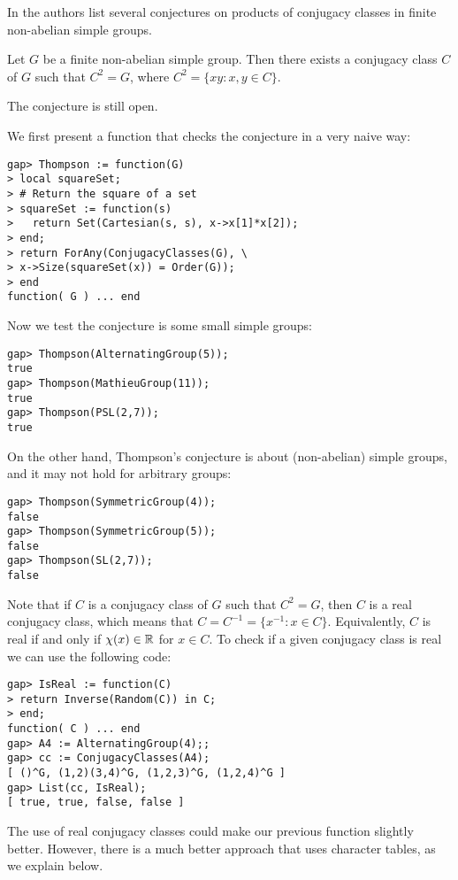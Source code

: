In \cite{MR783067} the authors list several conjectures
on products of conjugacy classes in finite non-abelian simple groups. 

\begin{conjecture}[Thompson]
    Let $G$ be a finite non-abelian simple group. Then there
    exists a conjugacy class $C$ of $G$ such that 
    $C^2=G$, where 
    $C^2=\{xy:x,y\in C\}$. 
\end{conjecture}

The conjecture is still open.

\begin{example}
    We first present a function that
    checks the conjecture in a very naive way:
\begin{lstlisting}
gap> Thompson := function(G)
> local squareSet;
> # Return the square of a set
> squareSet := function(s)
>   return Set(Cartesian(s, s), x->x[1]*x[2]);
> end;
> return ForAny(ConjugacyClasses(G), \ 
> x->Size(squareSet(x)) = Order(G));
> end
function( G ) ... end
\end{lstlisting}
Now we test the conjecture is some small simple groups:
\begin{lstlisting}
gap> Thompson(AlternatingGroup(5));
true
gap> Thompson(MathieuGroup(11));
true
gap> Thompson(PSL(2,7));
true
\end{lstlisting}
On the other hand, Thompson's conjecture is about (non-abelian) simple 
groups, and it may not hold for arbitrary groups: 
\begin{lstlisting}
gap> Thompson(SymmetricGroup(4));
false
gap> Thompson(SymmetricGroup(5));
false
gap> Thompson(SL(2,7));
false
\end{lstlisting}

    Note that if $C$ is a conjugacy class of $G$ such that 
    $C^2=G$, then $C$ is a real conjugacy class, which means that 
    $C=C^{-1}=\{x^{-1}:x\in C\}$. 
    Equivalently, $C$ is real if and only if $\chi(x)\in\mathbb{R}$ 
    for $x\in C$. To check if a given conjugacy class is real  
    we can use the following code: 
    
\begin{lstlisting}
gap> IsReal := function(C)
> return Inverse(Random(C)) in C;
> end;
function( C ) ... end
gap> A4 := AlternatingGroup(4);;
gap> cc := ConjugacyClasses(A4);
[ ()^G, (1,2)(3,4)^G, (1,2,3)^G, (1,2,4)^G ]
gap> List(cc, IsReal);
[ true, true, false, false ]
\end{lstlisting}

    The use of real conjugacy classes could make
    our previous function slightly better. However, 
    there is a much better approach that uses
    character tables, as we explain below.


\end{example}
